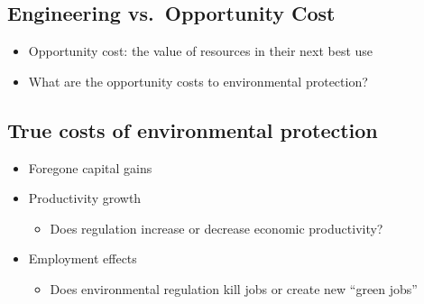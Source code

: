 \documentclass[
]{article}
\providecommand{\tightlist}{%
  \setlength{\itemsep}{0pt}\setlength{\parskip}{0pt}}
\begin{document}
\hypertarget{engineering-vs.-opportunity-cost}{%
\subsection{Engineering vs.~Opportunity
Cost}\label{engineering-vs.-opportunity-cost}}

\begin{itemize}
\tightlist
\item
  Opportunity cost: the value of resources in their next best use
\item
  What are the opportunity costs to environmental protection?
\end{itemize}

\hypertarget{true-costs-of-environmental-protection}{%
\subsection{True costs of environmental
protection}\label{true-costs-of-environmental-protection}}

\begin{itemize}
\tightlist
\item
  Foregone capital gains
\item
  Productivity growth

  \begin{itemize}
  \tightlist
  \item
    Does regulation increase or decrease economic productivity?
  \end{itemize}
\item
  Employment effects

  \begin{itemize}
  \tightlist
  \item
    Does environmental regulation kill jobs or create new ``green jobs''
  \end{itemize}
\end{itemize}

\hypertarget{section-2}{%
\subsection{}\label{section-2}}
\end{document}
